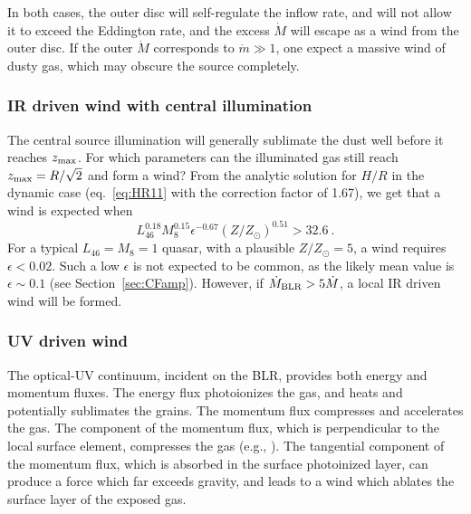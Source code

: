 \documentclass[a4paper,fleqn,usenatbib]{mnras}
\newcommand{\mdot}{\dot{M}}
\begin{document}
In both cases, the outer disc will self-regulate the inflow rate, and 
will not allow it to exceed the Eddington rate, and the excess $\mdot$ will escape as a wind from the
outer disc. If the outer $\mdot$ corresponds to $\dot{m}\gg 1$, one expect a massive wind of dusty gas,
which may obscure the source completely. 



\subsubsection{IR driven wind with central illumination}

The central source illumination will generally sublimate the dust well before it reaches $z_{\rm max}$.
For which parameters can the illuminated gas still reach $z_{\rm max}=R/\sqrt{2}$ and form a wind?
From the analytic solution for $H/R$ in the dynamic case (eq.~\ref{eq:HR11} with the correction factor of 1.67), we get 
that a wind is expected when
\begin{equation}
L_{46}^{0.18}M_8^{0.15}\epsilon^{-0.67}(Z/Z_{\odot})^{0.51}>32.6\ .
\end{equation}
For a typical $L_{46}=M_8=1$ quasar, with a plausible $Z/Z_{\odot}=5$, a wind requires $\epsilon<0.02$.
Such a low $\epsilon$ is not expected to be common, as the likely mean value is $\epsilon\sim 0.1$
(see Section~\ref{sec:CFamp}). However, if $\mdot_{\rm BLR}> 5\mdot$, a local IR driven wind 
will be formed.  



\subsubsection{UV driven wind}

The optical-UV continuum, incident on the BLR, provides both energy and momentum fluxes. The energy flux 
photoionizes the gas, and heats and
potentially sublimates the grains. The momentum flux compresses and accelerates the gas. The component of the
momentum flux, which is perpendicular to the local surface element, compresses the gas (e.g., \citealt{Pier95, paperI, paperII, Namekata16}). The tangential component of the momentum flux, which is absorbed in the surface photoinized layer, can produce a force which far exceeds gravity, and leads to a wind which ablates the surface
layer of the exposed gas. 
\end{document}
